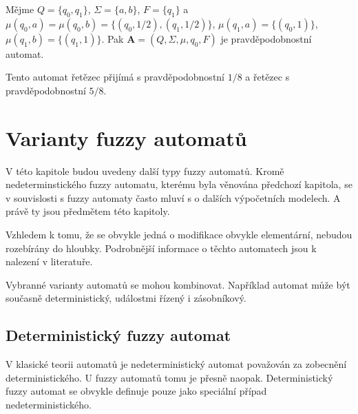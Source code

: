 \begin{example}
 Mějme $Q = \{ q_0, q_1 \}$, $\Sigma = \{ a, b \}$, $F = \{ q_1 \}$ a $\mu(q_0, a) = \mu(q_0, b) = \{ (q_0, 1/2), (q_1, 1/2) \}$, $\mu(q_1, a) = \{ (q_0, 1) \}$, $\mu(q_1, b) = \{ (q_1, 1) \}$. Pak $\mathbf{A} = (Q, \Sigma, \mu, q_0, F)$ je pravděpodobnostní automat.
 
 Tento automat řetězec  přijímá s pravděpodobnostní $1/8$ a řetězec  s pravděpodobnostní $5/8$.
\end{example}



\section{Varianty fuzzy automatů}
V této kapitole budou uvedeny další typy fuzzy automatů. Kromě nedeterminstického fuzzy automatu, kterému byla věnována předchozí kapitola, se v souvislosti s fuzzy automaty často mluví s o dalších výpočetních modelech. A právě ty jsou předmětem této kapitoly. 

Vzhledem k tomu, že se obvykle jedná o modifikace obvykle elementární, nebudou rozebírány do hloubky. Podrobnější informace o těchto automatech jsou k nalezení v literatuře.

\begin{note}
 Vybranné varianty automatů se mohou kombinovat. Například automat může být současně deterministický, událostmi řízený i zásobníkový.
\end{note}

\subsection{Deterministický fuzzy automat}

V klasické teorii automatů je nedeterministický automat považován za zobecnění deterministického. U fuzzy automatů tomu je přesně naopak. Deterministický fuzzy automat se obvykle definuje pouze jako speciální případ nedeterministického.

